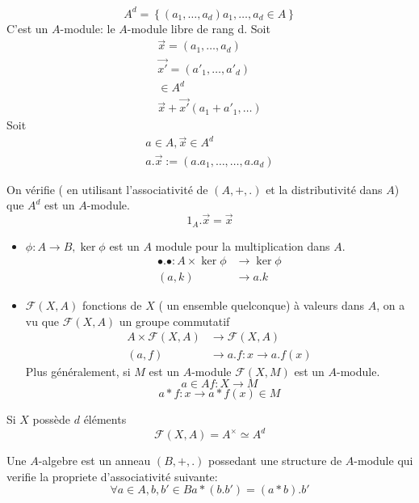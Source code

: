 \documentclass[../main.tex]{subfiles}
\begin{document}
 \[ 
	 A^{d}= \left\{ ( a_1,\ldots, a_d) a_1,\ldots, a_d \in A\right\}  
\]
C'est un $A$-module: le $A$-module libre de rang d.
Soit
\begin{align*}
	\vec{x}=(a_1,\ldots,a_d)\\
	\vec{x'}=(a'_1,\ldots,a'_d)\\
	\in A^{d}\\
	\vec{x} + \vec{x'} ( a_1+a'_1 , \ldots)
\end{align*}
Soit
\begin{align*}
a\in A, \vec{x} \in A^{d}\\
a.\vec{x} := ( a.a_1,\ldots, \ldots,a.a_d)
\end{align*}

On vérifie ( en utilisant l'associativité de $(A,+, .)$ et la distributivité dans $A$)
que $A^{d}$ est un $A$-module.
\[ 
1_A. \vec{x}= \vec{x}
\]
\begin{exemple}
\begin{itemize}
\item $\phi: A\to B , \ker \phi$ est un $A$ module pour la multiplication dans $A$.
	\begin{align*}
		\bullet.\bullet: A\times \ker \phi &\to \ker\phi\\
	( a,k)&\to a.k
	\end{align*}
	

\item $\mathcal{F}(X,A)$ fonctions de $X$ ( un ensemble quelconque) à valeurs dans $A$, on a vu que $\mathcal{F}(X,A)$ un groupe commutatif
	\begin{align*}
		A\times \mathcal{F}(X,A) &\to \mathcal{F}(X,A)\\
		( a,f)&\to a.f:x\to a.f(x)
	\end{align*}
	Plus généralement, si $M$ est un $A$-module $\mathcal{F}(X,M)$ est un $A$-module.
	\[ 
	a \in A f:X\to M
	\]
\[ 
	a\ast f: x \to a\ast f(x) \in M
\]
\end{itemize}

	\begin{rmq}
	Si $X$ possède $d$ éléments
	\[ 
		\mathcal{F}(X,A) = A^{\times} \simeq A^{d}
	\]
	
	\end{rmq}
\end{exemple}
\begin{defn}[$A$-Algebre]\label{defn:_a_algebre}
	Une $A$-algebre est un anneau $(B,+,.)$ possedant une structure de $A$-module qui verifie la propriete d'associativité suivante:
	\[ 
		\forall a \in A, b,b' \in B a \ast ( b.b')= ( a \ast b).b'
	\]
	
\end{defn}
\end{document}
